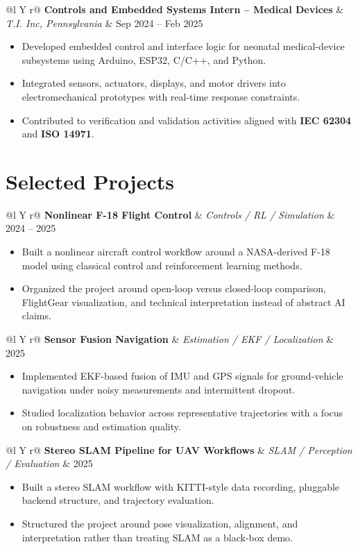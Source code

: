 \documentclass[10pt,letterpaper]{article}
\makeatletter
\newenvironment{role}[4]
{
\begin{tabularx}{\textwidth}{@{}l Y r@{}}
\textbf{#1} & \textit{#2, #3} & #4
\end{tabularx}
\vspace{-0.45em}
\begin{itemize}[leftmargin=1.15em, itemsep=0.14em, topsep=0.15em]
}
{
\end{itemize}
\vspace{0.05em}
}
\newenvironment{project}[3]
{
\begin{tabularx}{\textwidth}{@{}l Y r@{}}
\textbf{#1} & \textit{#2} & #3
\end{tabularx}
\vspace{-0.45em}
\begin{itemize}[leftmargin=1.15em, itemsep=0.14em, topsep=0.15em]
}
{
\end{itemize}
\vspace{0.05em}
}
\makeatother
\begin{document}
\begin{role}
{Controls and Embedded Systems Intern -- Medical Devices}
{T.I. Inc}
{Pennsylvania}
{Sep 2024 -- Feb 2025}
    \item Developed embedded control and interface logic for neonatal medical-device subsystems using Arduino, ESP32, C/C++, and Python.
    \item Integrated sensors, actuators, displays, and motor drivers into electromechanical prototypes with real-time response constraints.
    \item Contributed to verification and validation activities aligned with \textbf{IEC 62304} and \textbf{ISO 14971}.
\end{role}

\section{Selected Projects}

\begin{project}
{Nonlinear F-18 Flight Control}
{Controls / RL / Simulation}
{2024 -- 2025}
    \item Built a nonlinear aircraft control workflow around a NASA-derived F-18 model using classical control and reinforcement learning methods.
    \item Organized the project around open-loop versus closed-loop comparison, FlightGear visualization, and technical interpretation instead of abstract AI claims.
\end{project}

\begin{project}
{Sensor Fusion Navigation}
{Estimation / EKF / Localization}
{2025}
    \item Implemented EKF-based fusion of IMU and GPS signals for ground-vehicle navigation under noisy measurements and intermittent dropout.
    \item Studied localization behavior across representative trajectories with a focus on robustness and estimation quality.
\end{project}

\begin{project}
{Stereo SLAM Pipeline for UAV Workflows}
{SLAM / Perception / Evaluation}
{2025}
    \item Built a stereo SLAM workflow with KITTI-style data recording, pluggable backend structure, and trajectory evaluation.
    \item Structured the project around pose visualization, alignment, and interpretation rather than treating SLAM as a black-box demo.
\end{project}
\end{document}
